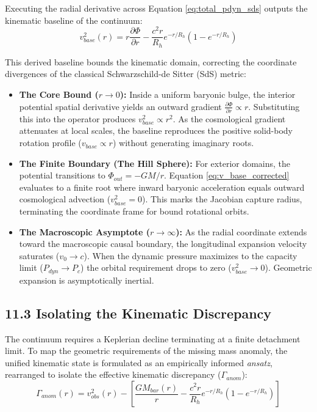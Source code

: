 Executing the radial derivative across Equation \ref{eq:total_pdyn_sds} outputs the kinematic baseline of the continuum: 
\begin{equation} 
v_{base}^2(r) = r \frac{\partial \Phi}{\partial r} - \frac{c^2 r}{R_h} e^{-r/R_h} \left(1 - e^{-r/R_h}\right) \label{eq:v_base_corrected} 
\end{equation}

This derived baseline bounds the kinematic domain, correcting the coordinate divergences of the classical Schwarzschild-de Sitter (SdS) metric: 
\begin{itemize} 
    \item \textbf{The Core Bound ($r \to 0$):} Inside a uniform baryonic bulge, the interior potential spatial derivative yields an outward gradient $\frac{\partial \Phi}{\partial r} \propto r$. Substituting this into the operator produces $v_{base}^2 \propto r^2$. As the cosmological gradient attenuates at local scales, the baseline reproduces the positive solid-body rotation profile ($v_{base} \propto r$) without generating imaginary roots.
    \item \textbf{The Finite Boundary (The Hill Sphere):} For exterior domains, the potential transitions to $\Phi_{out} = -GM/r$. Equation \ref{eq:v_base_corrected} evaluates to a finite root where inward baryonic acceleration equals outward cosmological advection ($v_{base}^2 = 0$). This marks the Jacobian capture radius, terminating the coordinate frame for bound rotational orbits. 
    \item \textbf{The Macroscopic Asymptote ($r \to \infty$):} As the radial coordinate extends toward the macroscopic causal boundary, the longitudinal expansion velocity saturates ($v_0 \to c$). When the dynamic pressure maximizes to the capacity limit ($P_{dyn} \to P_c$) the orbital requirement drops to zero ($v_{base}^2 \to 0$). Geometric expansion is asymptotically inertial.
\end{itemize}

\subsection*{11.3 Isolating the Kinematic Discrepancy} 
The continuum requires a Keplerian decline terminating at a finite detachment limit. To map the geometric requirements of the missing mass anomaly, the unified kinematic state is formulated as an empirically informed \textit{ansatz}, rearranged to isolate the effective kinematic discrepancy ($\Gamma_{anom}$): 
\begin{equation} 
    \Gamma_{anom}(r) = v_{obs}^2(r) - \left[ \frac{GM_{bar}(r)}{r} - \frac{c^2 r}{R_h} e^{-r/R_h} \left(1 - e^{-r/R_h}\right) \right]
\end{equation}

